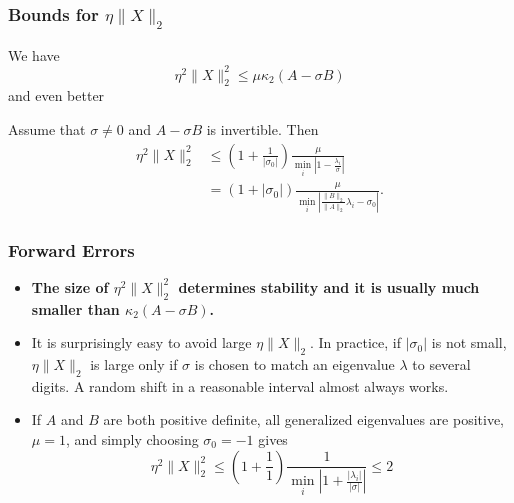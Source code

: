 \documentclass[landscape]{beamer}
\begin{document}
\begin{frame}
  \frametitle{Bounds for $\eta \|X\|_2$}

  We have
  \begin{equation*}
     \eta^2 \|X\|_2^2 \leq \mu \kappa_2(A-\sigma B)
  \end{equation*}
  and even better
  \begin{lemma}
    Assume that $\sigma \neq 0$ and $A-\sigma B$ is invertible.  Then
    \begin{align*}
      \eta^2 \|X\|_2^2 
      & \leq
      \left(1 + \frac{1}{|\sigma_0|}\right)
      \frac{\mu}{\min_i \left| 1 - \frac{\lambda_i}{\sigma}\right|} \\
      & = 
        (1 + |\sigma_0|)
        \frac{\mu}
        {\min_i \left|\frac{\|B\|_2}{\|A\|_2}\lambda_i - \sigma_0\right|}.
    \end{align*}
  \end{lemma}
\end{frame}

\begin{frame}
  \frametitle{Forward Errors}


  \begin{itemize}
  \item {\bf The size of $\eta^2 \|X\|_2^2$ determines stability and
      it is usually much smaller than $\kappa_2(A-\sigma B)$.}
  \item It is surprisingly easy to avoid large $\eta \|X\|_2$.  In
    practice, if $|\sigma_0|$ is not small, $\eta \|X\|_2$ is large
    only if $\sigma$ is chosen to match an eigenvalue $\lambda$ to
    several digits.  A random shift in a reasonable interval almost
    always works.
  \item If $A$ and $B$ are both positive definite, all generalized eigenvalues
    are positive, $\mu = 1$, and simply choosing $\sigma_0 = -1$ gives
    \begin{equation*}
      \eta^2 \|X\|_2^2 \leq 
      \left(1 + \frac{1}{1}\right) \frac{1}{\min_i \left| 1 + \frac{|\lambda_i|}{|\sigma|}\right|} \leq 2
    \end{equation*}

  \end{itemize}
\end{frame}
\end{document}
